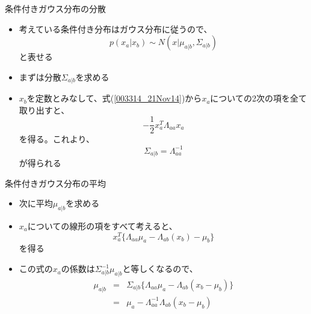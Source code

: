 \begin{frame}{条件付きガウス分布の分散}
 \begin{itemize}
  \item 考えている条件付き分布はガウス分布に従うので、
        \begin{equation}
         p(x_a | x_b) \sim N(x | \mu_{a|b}, \Sigma_{a|b})
        \end{equation}
        と表せる
  \item まずは分散$\Sigma_{a|b}$を求める
  \item $x_b$を定数とみなして、式(\ref{003314_21Nov14})から$x_a$についての2次の項を全て取り出すと、
        \begin{equation}
         -\frac{1}{2}x_a^T\Lambda_{aa}x_a
        \end{equation}
        を得る。これより、
        \begin{equation}
         \Sigma_{a|b} = \Lambda_{aa}^{-1}
        \end{equation}
        が得られる
 \end{itemize}
\end{frame}

\begin{frame}{条件付きガウス分布の平均}
 \begin{itemize}
  \item 次に平均$\mu_{a|b}$を求める
  \item $x_a$についての線形の項をすべて考えると、
        \begin{equation}
         x_a^T\{ \Lambda_{aa}\mu_a-\Lambda_{ab}(x_b)-\mu_b\}
        \end{equation}
        を得る
  \item この式の$x_a$の係数は$\Sigma^{-1}_{a|b}\mu_{a|b}$と等しくなるので、
        \begin{eqnarray}
         \mu_{a|b} &=& \Sigma_{a|b}\{\Lambda_{aa}\mu_a-\Lambda_{ab}(x_b-\mu_b)\}\\
         &= & \mu_a - \Lambda_{aa}^{-1}\Lambda_{ab}(x_b-\mu_b)
        \end{eqnarray}
 \end{itemize}
\end{frame}

